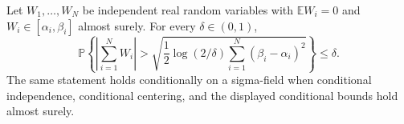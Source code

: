 Let \(W_1,\ldots,W_N\) be independent real random variables with \(\mathbb E W_i=0\) and \(W_i\in[\alpha_i,\beta_i]\) almost surely. For every \(\delta\in(0,1)\),
\[
\mathbb P\!\left\{\left|\sum_{i=1}^N W_i\right|>
\sqrt{\frac12\log(2/\delta)\sum_{i=1}^N(\beta_i-\alpha_i)^2}\right\}\le\delta.
\]
The same statement holds conditionally on a sigma-field when conditional independence, conditional centering, and the displayed conditional bounds hold almost surely.